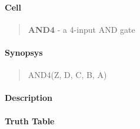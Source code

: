 \label{AND4}
\paragraph{Cell}
\begin{quote}
    \textbf{AND4} - a 4-input AND gate
\end{quote}

\paragraph{Synopsys}
\begin{quote}
    AND4(Z, D, C, B, A)
\end{quote}

\paragraph{Description}

%

\paragraph{Truth Table}


